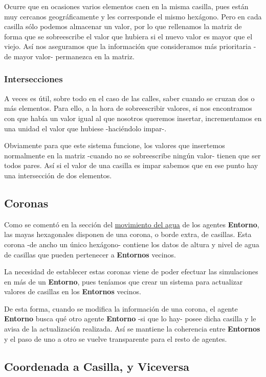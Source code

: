 Ocurre que en ocasiones varios elementos caen en la misma casilla, pues están
muy cercanos geográficamente y les corresponde el mismo hexágono. Pero en cada
casilla sólo podemos almacenar un valor, por lo que rellenamos la matriz de
forma que se sobreescribe el valor que hubiera si el nuevo valor es mayor que el
viejo. Así nos aseguramos que la información que consideramos más prioritaria
-de mayor valor- permanezca en la matriz.

\subsubsection*{Intersecciones}

A veces es útil, sobre todo en el caso de las calles, saber cuando se cruzan
dos o más elementos. Para ello, a la hora de sobreescribir valores, si nos
encontramos con que había un valor igual al que nosotros queremos insertar,
incrementamos en una unidad el valor que hubiese -haciéndolo impar-.

Obviamente para que este sistema funcione, los valores que insertemos
normalmente en la matriz -cuando no se sobreescribe ningún valor- tienen que ser
todos pares. Así si el valor de una casilla es impar sabemos que en ese punto
hay una intersección de dos elementos.

\subsection*{Coronas}

Como se comentó en la sección del \hyperref[waterMovement]{movimiento del agua}
de los agentes {\bf Entorno}, las mayas hexagonales disponen de una corona, o
borde extra, de casillas. Esta corona -de ancho un único hexágono- contiene los
datos de altura y nivel de agua de casillas que pueden pertenecer a {\bf
Entornos} vecinos.

La necesidad de establecer estas coronas viene de poder efectuar las
simulaciones en más de un {\bf Entorno}, pues teníamos que crear un sistema para
actualizar valores de casillas en los {\bf Entornos} vecinos.

De esta forma, cuando se modifica la información de una corona, el agente {\bf
Entorno} busca qué otro agente {\bf Entorno} -si que lo hay- posee dicha
casilla y le avisa de la actualización realizada. Así se mantiene la coherencia
entre {\bf Entornos} y el paso de uno a otro se vuelve transparente para el
resto de agentes.

\subsection*{Coordenada a Casilla, y Viceversa} \label{coordToCasilla}

